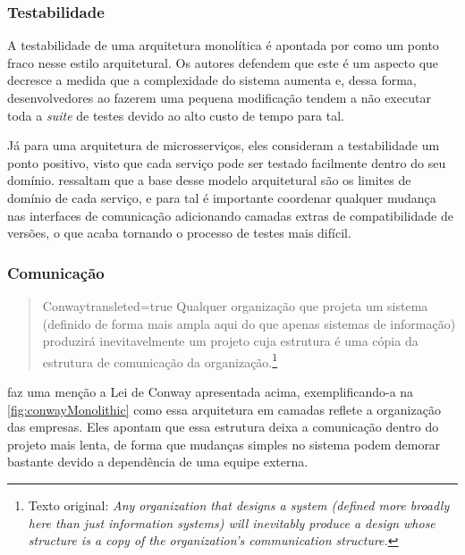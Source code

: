 \subsubsection{Testabilidade}
\label{testabilidade}

A testabilidade de uma arquitetura monolítica é apontada por 
como um ponto fraco nesse estilo arquitetural. Os autores defendem que este é um aspecto que decresce a
medida que a complexidade do sistema aumenta e, dessa forma, desenvolvedores ao fazerem uma pequena
modificação tendem a não executar toda a \textit{suite} de testes devido ao alto custo de tempo para
tal.

Já para uma arquitetura de microsserviços, eles consideram a testabilidade um ponto positivo, visto que
cada serviço pode ser testado facilmente dentro do seu domínio. 
ressaltam que a base desse modelo arquitetural são os limites de domínio de cada serviço, e
para tal é importante coordenar qualquer mudança nas interfaces de comunicação adicionando camadas
extras de compatibilidade de versões, o que acaba tornando o processo de testes mais difícil.

\subsubsection{Comunicação}
\label{pers:comunicacao}

\begin{quotation}{Conway}{transleted=true}
    Qualquer organização que projeta um sistema (definido de forma mais ampla aqui do que apenas sistemas de informação)
    produzirá inevitavelmente um projeto cuja estrutura é uma cópia da estrutura de comunicação da
    organização.\footnote{Texto original: \textit{Any organization that designs a system (defined more broadly
    here than just information systems) will inevitably produce a design whose structure is a copy
    of the organization's communication structure.}}
\end{quotation}

 faz uma menção a Lei de Conway apresentada acima,
exemplificando-a na \autoref{fig:conwayMonolithic} como essa arquitetura em camadas reflete a
organização das empresas. Eles apontam que essa estrutura deixa a comunicação dentro do projeto mais
lenta, de forma que mudanças simples no sistema podem demorar bastante devido a dependência de uma
equipe externa.


